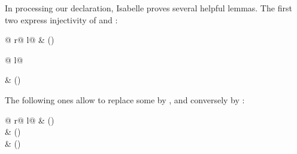 \begin{isabellebody}
\begin{isamarkuptext}
In processing our  declaration, 
Isabelle proves several helpful lemmas. The first two
express injectivity of  and :
\begin{center}
\begin{tabular}{@ {}r@ {\qquad}l@ {}}
 & () \\
\begin{tabular}{@ {}l@ {}}
 \\
\end{tabular} & () \\
\end{tabular}
\end{center}
The following ones allow to replace some  by
, and conversely  by :
\begin{center}
\begin{tabular}{@ {}r@ {\qquad}l@ {}}
 & () \\
 & () \\
 & () \\

\end{tabular}
\end{center}
\end{isamarkuptext}
\end{isabellebody}
